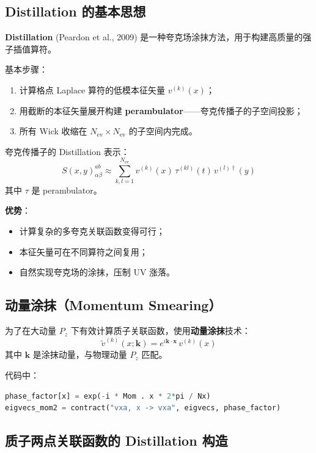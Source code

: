\documentclass[11pt,a4paper]{ctexart}
\begin{document}
\subsection{Distillation 的基本思想}

\textbf{Distillation} (Peardon et al., 2009) 是一种夸克场涂抹方法，用于构建高质量的强子插值算符。

基本步骤：
\begin{enumerate}
  \item 计算格点 Laplace 算符的低模本征矢量 $v^{(k)}(x)$；
  \item 用截断的本征矢量展开构建 \textbf{perambulator}——夸克传播子的子空间投影；
  \item 所有 Wick 收缩在 $N_{\text{ev}} \times N_{\text{ev}}$ 的子空间内完成。
\end{enumerate}

夸克传播子的 Distillation 表示：
\begin{equation}\label{eq:distillation}
S(x, y)_{\alpha\beta}^{ab} \approx \sum_{k,l=1}^{N_{\text{ev}}}
v^{(k)}(x) \, \tau^{(kl)}(t) \, v^{(l)\dagger}(y)
\end{equation}
其中 $\tau$ 是 perambulator。

\textbf{优势}：
\begin{itemize}
  \item 计算复杂的多夸克关联函数变得可行；
  \item 本征矢量可在不同算符之间复用；
  \item 自然实现夸克场的涂抹，压制 UV 涨落。
\end{itemize}

\subsection{动量涂抹（Momentum Smearing）}

为了在大动量 $P_z$ 下有效计算质子关联函数，使用\textbf{动量涂抹}技术：
\begin{equation}\label{eq:momsmear}
\tilde{v}^{(k)}(x; \mathbf{k}) = e^{i \mathbf{k} \cdot \mathbf{x}} \, v^{(k)}(x)
\end{equation}
其中 $\mathbf{k}$ 是涂抹动量，与物理动量 $P_z$ 匹配。

代码中：
\begin{lstlisting}[language=Python]
phase_factor[x] = exp(-i * Mom . x * 2*pi / Nx)
eigvecs_mom2 = contract("vxa, x -> vxa", eigvecs, phase_factor)
\end{lstlisting}

\subsection{质子两点关联函数的 Distillation 构造}
\end{document}
